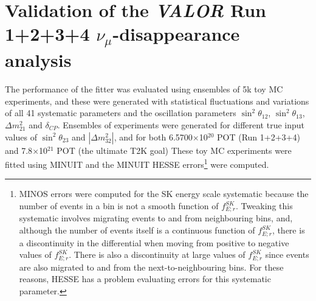 \clearpage

\section {Validation of the {\em VALOR} Run 1+2+3+4  $\nu_{\mu}$-disappearance analysis}
\label{sec:validation}

The performance of the fitter was evaluated using ensembles of 5k toy MC experiments, and these were
generated with statistical fluctuations and variations of all 41 systematic parameters and the oscillation parameters 
$\sin^{2}\theta_{12}$, $\sin^{2}\theta_{13}$, $\Delta m^{2}_{21}$ and $\delta_{CP}$. Ensembles of experiments were 
generated for different true input values of $\sin^{2}\theta_{23}$ and $|\Delta m^{2}_{32}|$, and for both 
6.5700$\times$10$^{20}$ POT (Run 1+2+3+4) and 7.8$\times$10$^{21}$ POT (the ultimate T2K goal)
These toy MC experiments were fitted using MINUIT and the MINUIT HESSE errors\footnote
{MINOS errors were computed for the SK energy scale systematic because the number of events in a bin is not a smooth 
function of $f^{SK}_{E;r}$. Tweaking this systematic involves migrating events to and from neighbouring bins, and, 
although the number of events itself is a continuous function of $f^{SK}_{E;r}$, there is a discontinuity in the differential 
when moving from positive to negative values of $f^{SK}_{E;r}$. There is also a discontinuity at large values of $f^{SK}_{E;r}$ 
since events are also migrated to and from the next-to-neighbouring bins. For these reasons, HESSE has a problem evaluating 
errors for this systematic parameter.
} 
were computed.

